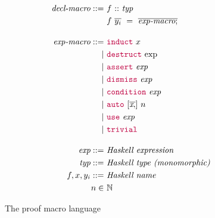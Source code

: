 \begin{figure}
\begin{align*}
  \textit{decl-macro} ::= &
    ~ f ~ \mathtt{::} ~ \textit{typ} \\ &
    ~ f ~ \overline{y_i} ~ = ~ \overline{\textit{exp-macro} ;}
  \\[1em]
  \textit{exp-macro} ::= &
    ~ {\color{purple}\mathtt{induct}} ~ x \\ \mid &
    ~ {\color{purple}\mathtt{destruct}} ~ \text{exp} \\ \mid &
    ~ {\color{purple}\mathtt{assert}} ~ \textit{exp} \\ \mid &
    ~ {\color{purple}\mathtt{dismiss}} ~ \textit{exp} \\ \mid &
    ~ {\color{purple}\mathtt{condition}} ~ \textit{exp} \\ \mid &
    ~ {\color{purple}\mathtt{auto}} ~ [\overline{\textit{x} ,}] ~ n \\ \mid &
    ~ {\color{purple}\mathtt{use}} ~ \textit{exp} \\ \mid &
    ~ {\color{purple}\mathtt{trivial}}
  \\[1em]
  \textit{exp} ::= & ~ \textit{Haskell expression} 
  \\
  \textit{typ} ::= & ~ \textit{Haskell type (monomorphic)} 
  \\
  f, x, y_i ::= & ~ \textit{Haskell name} 
  \\
  n \in & ~ \mathbb{N}
\end{align*}
\caption{The proof macro language}
\label{fig:proof-macro-lang}
\end{figure}


